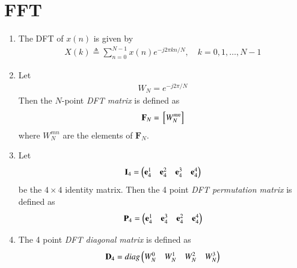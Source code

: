 \documentclass[journal,12pt,twocolumn]{IEEEtran}
\let\vec\mathbf
\renewcommand\thesection{\arabic{section}}
\begin{document}
\section{FFT}
\begin{enumerate}[label=\thesection.\arabic*]
    \item The DFT of $x(n)$ is given by
    \begin{align}
        X(k) \triangleq \sum_{n=0}^{N-1} x(n) e^{-j 2 \pi k n / N}, \quad k=0,1, \ldots, N-1
    \end{align}
\item Let 
	\begin{align}
W_{N} = e^{-j2\pi/N} 
	\end{align}
		Then the $N$-point {\em DFT matrix} is defined as 
	\begin{align}
		\vec{F}_{N} = \sbrak{W_{N}^{mn}}
	\end{align}
	where $W_{N}^{mn}$ are the elements of $\vec{F}_{N}$.
\item Let 
	\begin{align}
		\vec{I}_4 = \myvec{\vec{e}_4^{1} &\vec{e}_4^{2} &\vec{e}_4^{3} &\vec{e}_4^{4} }
	\end{align}
		be the $4\times 4$ identity matrix.  Then the 4 point {\em DFT permutation matrix} is defined as 
	\begin{align}
		\vec{P}_4 = \myvec{\vec{e}_4^{1} &\vec{e}_4^{3} &\vec{e}_4^{2} &\vec{e}_4^{4} }
	\end{align}
\item The 4 point {\em DFT diagonal matrix} is defined as 
	\begin{align}
		\vec{D}_4 = diag\myvec{W_{N}^{0} & W_{N}^{1} & W_{N}^{2} & W_{N}^{3}}
	\end{align}





\end{enumerate}
\end{document}
